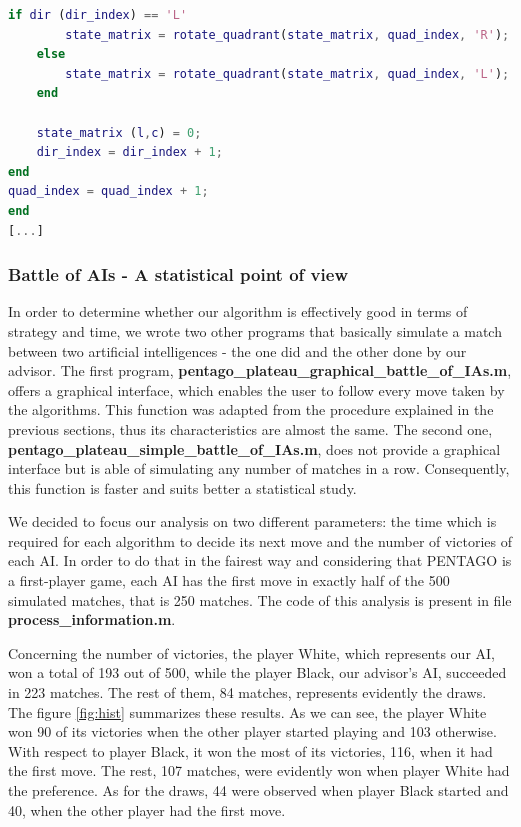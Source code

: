 \vspace{10pt}

\begin{lstlisting}[language=Matlab]
	if dir (dir_index) == 'L'
		state_matrix = rotate_quadrant(state_matrix, quad_index, 'R');
	else
		state_matrix = rotate_quadrant(state_matrix, quad_index, 'L');
	end

	state_matrix (l,c) = 0;
	dir_index = dir_index + 1;
end
quad_index = quad_index + 1;
end
[...]
\end{lstlisting}

\subsubsection{Battle of AIs - A statistical point of view}
                        

In order to determine whether our algorithm is effectively good in terms of
strategy and time, we wrote two other programs that basically simulate a match
between two artificial intelligences - the one did and the other done by our
advisor. The first program,
\textbf{pentago\_plateau\_graphical\_battle\_of\_IAs.m}, offers a graphical
interface, which enables the user to follow every move taken by the algorithms.
This function was adapted from the procedure explained in the previous
sections, thus its characteristics are almost the same. The second one,
\textbf{pentago\_plateau\_simple\_battle\_of\_IAs.m}, does not provide a
graphical interface but is able of simulating any number of matches in a row.
Consequently, this function is faster and suits better a statistical study.

\vspace{10pt}

We decided to focus our analysis on two different parameters: the time which is
required for each algorithm to decide its next move and the number of victories
of each AI. In order to do that in the fairest way and considering that PENTAGO
is a first-player game, each AI has the first move in exactly half of the 500
simulated matches, that is 250 matches. The code of this analysis is present in
file \textbf{process\_information.m}.


\vspace{10pt}

Concerning the number of victories, the player White, which represents our AI,
won a total of 193 out of 500, while the player Black, our advisor’s AI,
succeeded in 223 matches. The rest of them, 84 matches, represents evidently
the draws. The figure \ref{fig:hist} summarizes these results. As we can see,
the player White won 90 of its victories when the other player started playing and 103
otherwise. With respect to player Black, it won the most of its victories, 116,
when it had the first move. The rest, 107 matches, were evidently won when
player White had the preference. As for the draws, 44 were observed when player
Black started and 40, when the other player had the first move.

